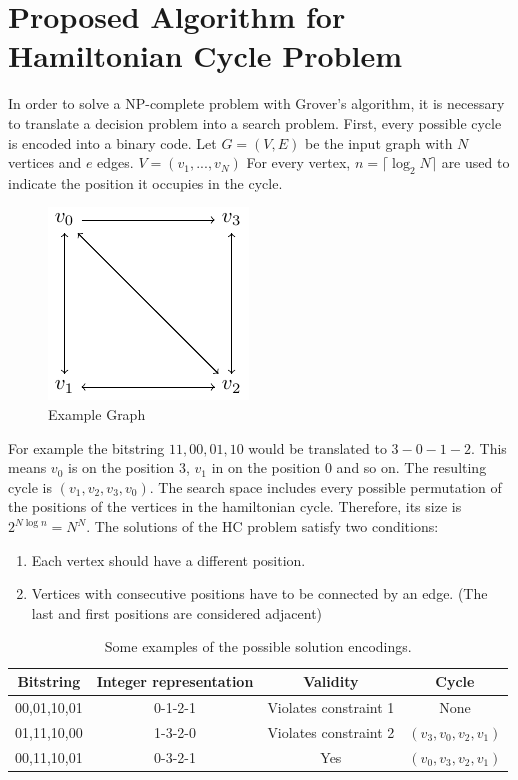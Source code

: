 \documentclass[10pt,a4paper]{article}
\begin{document}
\section{Proposed Algorithm for Hamiltonian Cycle Problem}
In order to solve a NP-complete problem with Grover's algorithm, it is necessary to translate a decision problem into a search problem. First, every possible cycle is encoded into a binary code. Let $G=(V, E)$ be the input graph with $N$ vertices and $e$ edges. $V = (v_1, ..., v_N)$ For every vertex, $n = \lceil \log_2 N \rceil$ are used to indicate the position it occupies in the cycle.\\
\begin{figure}[hbtp]
\centering
\includegraphics[scale=1]{figures/ExampleGraph.pdf}
\caption{Example Graph}
\end{figure}

For example the bitstring $11,00,01,10$ would be translated to $3-0-1-2$. This means $v_0$ is on the position $3$, $v_1$ in on the position $0$ and so on. The resulting cycle is $(v_1, v_2, v_3, v_0)$.
The search space includes every possible permutation of the positions of the vertices in the hamiltonian cycle. Therefore, its size is $2^{N\log n} = N^N$. The solutions of the HC problem satisfy two conditions:
\begin{enumerate}
\item Each vertex should have a different position.
\item Vertices with consecutive positions have to be connected by an edge. (The last and first positions are considered adjacent)
\end{enumerate}
\begin{table}[htbp]
    \centering
    \begin{tabular}{|c|c|c|c|}
        \hline
        Bitstring & Integer representation & Validity & Cycle \\
        \hline
        00,01,10,01 & 0-1-2-1 & Violates constraint 1 & None \\
        01,11,10,00 & 1-3-2-0 & Violates constraint 2 & $(v_3, v_0, v_2, v_1)$ \\
        00,11,10,01 & 0-3-2-1 & Yes & $(v_0, v_3, v_2, v_1)$\\
        \hline
    \end{tabular}
    \label{tab:example}
    \caption{Some examples of the possible solution encodings.}
\end{table}
\end{document}
